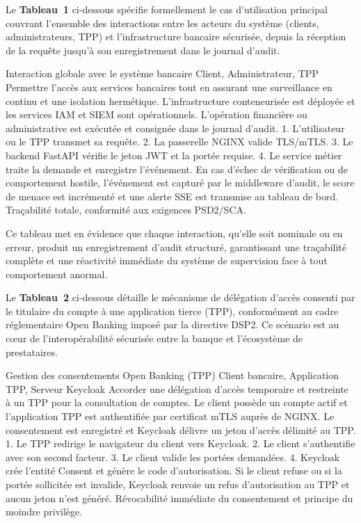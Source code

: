 Le \textbf{Tableau~1} ci-dessous spécifie formellement le cas d'utilisation principal couvrant l'ensemble des interactions entre les acteurs du système (clients, administrateurs, TPP) et l'infrastructure bancaire sécurisée, depuis la réception de la requête jusqu'à son enregistrement dans le journal d'audit.

\scenariotable
{Interaction globale avec le système bancaire}
{Client, Administrateur, TPP}
{Permettre l'accès aux services bancaires tout en assurant une surveillance en continu et une isolation hermétique.}
{L'infrastructure conteneurisée est déployée et les services IAM et SIEM sont opérationnels.}
{L'opération financière ou administrative est exécutée et consignée dans le journal d'audit.}
{1. L'utilisateur ou le TPP transmet sa requête. 2. La passerelle NGINX valide TLS/mTLS. 3. Le backend FastAPI vérifie le jeton JWT et la portée requise. 4. Le service métier traite la demande et enregistre l'événement.}
{En cas d'échec de vérification ou de comportement hostile, l'événement est capturé par le middleware d'audit, le score de menace est incrémenté et une alerte SSE est transmise au tableau de bord.}
{Traçabilité totale, conformité aux exigences PSD2/SCA.}

\noindent Ce tableau met en évidence que chaque interaction, qu'elle soit nominale ou en erreur, produit un enregistrement d'audit structuré, garantissant une traçabilité complète et une réactivité immédiate du système de supervision face à tout comportement anormal.

\bigskip
\noindent Le \textbf{Tableau~2} ci-dessous détaille le mécanisme de délégation d'accès consenti par le titulaire du compte à une application tierce (TPP), conformément au cadre réglementaire Open Banking imposé par la directive DSP2. Ce scénario est au cœur de l'interopérabilité sécurisée entre la banque et l'écosystème de prestataires.

\scenariotable
{Gestion des consentements Open Banking (TPP)}
{Client bancaire, Application TPP, Serveur Keycloak}
{Accorder une délégation d'accès temporaire et restreinte à un TPP pour la consultation de comptes.}
{Le client possède un compte actif et l'application TPP est authentifiée par certificat mTLS auprès de NGINX.}
{Le consentement est enregistré et Keycloak délivre un jeton d'accès délimité au TPP.}
{1. Le TPP redirige le navigateur du client vers Keycloak. 2. Le client s'authentifie avec son second facteur. 3. Le client valide les portées demandées. 4. Keycloak crée l'entité Consent et génère le code d'autorisation.}
{Si le client refuse ou si la portée sollicitée est invalide, Keycloak renvoie un refus d'autorisation au TPP et aucun jeton n'est généré.}
{Révocabilité immédiate du consentement et principe du moindre privilège.}

